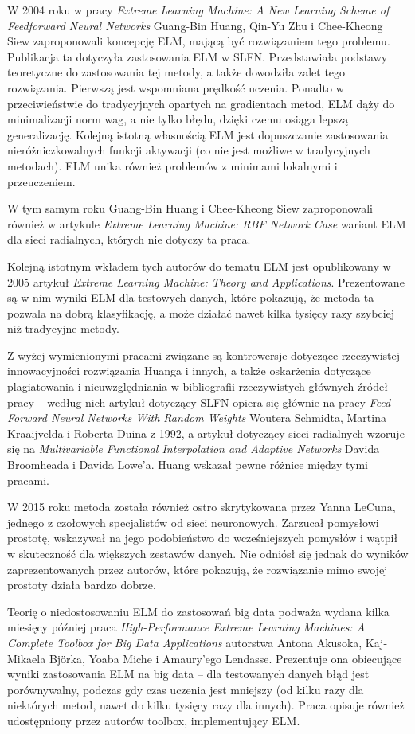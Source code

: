 \documentclass{article}
\begin{document}
W 2004 roku w pracy \textit{Extreme Learning Machine: A New Learning Scheme of Feedforward Neural Networks} Guang-Bin Huang, Qin-Yu Zhu i Chee-Kheong Siew zaproponowali koncepcję ELM, mającą być rozwiązaniem tego problemu. Publikacja ta dotyczyła zastosowania ELM w SLFN. Przedstawiała podstawy teoretyczne do zastosowania tej metody, a także dowodziła zalet tego rozwiązania. Pierwszą jest wspomniana prędkość uczenia. Ponadto w przeciwieństwie do tradycyjnych opartych na gradientach metod, ELM dąży do minimalizacji norm wag, a nie tylko błędu, dzięki czemu osiąga lepszą generalizację. Kolejną istotną własnością ELM jest dopuszczanie zastosowania nieróżniczkowalnych funkcji aktywacji (co nie jest możliwe w tradycyjnych metodach). ELM unika również problemów z minimami lokalnymi i przeuczeniem. 

W tym samym roku Guang-Bin Huang i Chee-Kheong Siew zaproponowali również w artykule \textit{Extreme Learning Machine: RBF Network Case} wariant ELM dla sieci radialnych, których nie dotyczy ta praca. 

Kolejną istotnym wkładem tych autorów do tematu ELM jest opublikowany w 2005 artykuł \textit{Extreme Learning Machine: Theory and Applications}. Prezentowane są w nim wyniki ELM dla testowych danych, które pokazują, że metoda ta pozwala na dobrą klasyfikację, a może działać nawet kilka tysięcy razy szybciej niż tradycyjne metody.

Z wyżej wymienionymi pracami związane są kontrowersje dotyczące rzeczywistej innowacyjności rozwiązania Huanga i innych, a także oskarżenia dotyczące plagiatowania i nieuwzględniania w bibliografii rzeczywistych głównych źródeł pracy -- według nich artykuł dotyczący SLFN opiera się głównie na pracy \textit{Feed Forward Neural Networks With Random Weights} Woutera Schmidta, Martina Kraaijvelda i Roberta Duina z 1992, a artykuł dotyczący sieci radialnych wzoruje się na \textit{Multivariable Functional Interpolation and Adaptive Networks} Davida Broomheada i Davida Lowe'a. Huang wskazał pewne różnice między tymi pracami.

W 2015 roku metoda została również ostro skrytykowana przez Yanna LeCuna, jednego z czołowych specjalistów od sieci neuronowych. Zarzucał pomysłowi prostotę, wskazywał na jego podobieństwo do wcześniejszych pomysłów i wątpił w skuteczność dla większych zestawów danych. Nie odniósł się jednak do wyników zaprezentowanych przez autorów, które pokazują, że rozwiązanie mimo swojej prostoty działa bardzo dobrze.

Teorię o niedostosowaniu ELM do zastosowań big data podważa wydana kilka miesięcy później praca \textit{High-Performance Extreme Learning Machines: A Complete Toolbox for Big Data Applications} autorstwa Antona Akusoka, Kaj-Mikaela Bj\"orka, Yoaba Miche i Amaury'ego Lendasse. Prezentuje ona obiecujące wyniki zastosowania ELM na big data -- dla testowanych danych błąd jest porównywalny, podczas gdy czas uczenia jest mniejszy (od kilku razy dla niektórych metod, nawet do kilku tysięcy razy dla innych). Praca opisuje również udostępniony przez autorów toolbox, implementujący ELM.
\end{document}
